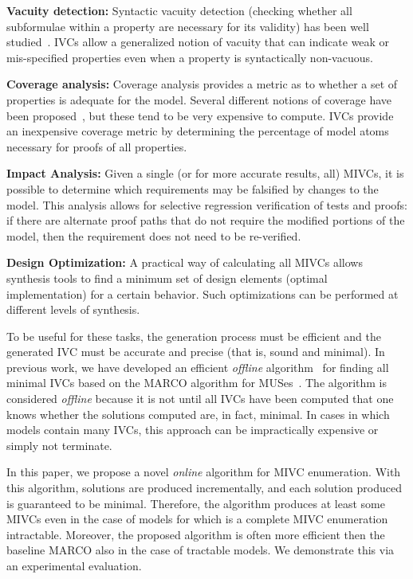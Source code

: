 \noindent \textbf{Vacuity detection:} Syntactic vacuity detection (checking whether all subformulae within a property are necessary for its validity) has been well studied~\cite{Kupferman03:Vacuity}.   IVCs allow a generalized notion of vacuity that can indicate weak or mis-specified properties even when a property is syntactically non-vacuous.

\noindent \textbf{Coverage analysis:} Coverage analysis provides a metric as to whether a set of properties is adequate for the model.  Several different notions of coverage have been proposed~\cite{chockler_coverage_2003,kupferman_theory_2008}, but these tend to be very expensive to compute.  IVCs provide an inexpensive coverage metric by determining the percentage of model atoms necessary for proofs of all properties.

\noindent \textbf{Impact Analysis:} Given a single (or for more accurate results, all) MIVCs, it is possible to determine which requirements may be falsified by changes to the model.  This analysis allows for selective regression verification of tests and proofs: if there are alternate proof paths that do not require the modified portions of the model, then the requirement does not need to be re-verified.

\noindent \textbf{Design Optimization:} A practical way of calculating all MIVCs allows synthesis tools to find a minimum set of design elements (optimal implementation) for a certain behavior. Such optimizations can be performed at different levels of synthesis.

To be useful for these tasks, the generation process must be efficient and the generated IVC must be accurate and precise (that is, sound and minimal).  In previous work, we have developed an efficient {\em offline} algorithm~\cite{Ghass17AllIVCs} for finding all minimal IVCs based on the MARCO algorithm for MUSes~\cite{marco2016fast}.  The algorithm is considered {\em offline} because it is not until all IVCs have been computed that one knows whether the solutions computed are, in fact, minimal.  In cases in which models contain many IVCs, this approach can be impractically expensive or simply not terminate.

In this paper, we propose a novel {\em online} algorithm for MIVC enumeration.  With this algorithm, solutions are produced incrementally, and each solution produced is guaranteed to be minimal.
Therefore, the algorithm produces at least some MIVCs even in the case of models for which is a complete MIVC enumeration intractable. Moreover, the proposed algorithm is often more efficient then the baseline MARCO also in the case of tractable models.
We demonstrate this via an experimental evaluation.

